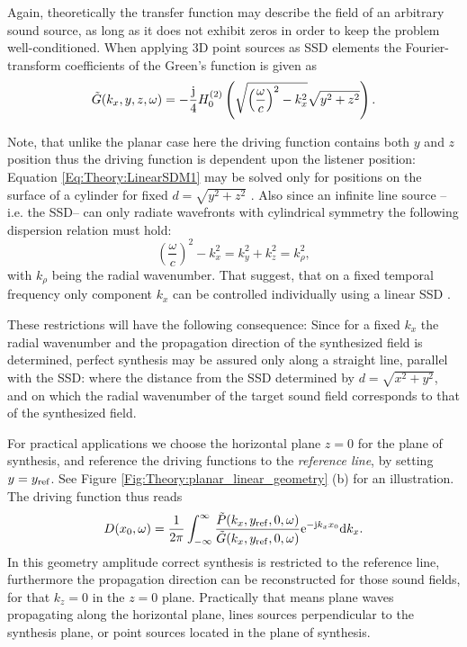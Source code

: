 Again, theoretically the transfer function may describe the field of an arbitrary sound source, as long as it does not exhibit zeros in order to keep the problem well-conditioned.
When applying 3D point sources as SSD elements the Fourier-transform coefficients of the Green's function is given as \cite{Ahrens2010a}
\begin{equation}
\tilde{G}(k_x,y,z,\omega) = -\frac{\mathrm{j}}{4} H_0^{(2)}\left( \sqrt{ \left( \frac{\omega}{c} \right)^2 - k_x^2 } \sqrt{ y^2 + z^2 } \right).
\end{equation}

\vspace{3mm}
Note, that unlike the planar case here the driving function contains both $y$ and $z$ position thus the driving function is dependent upon the listener position: Equation \eqref{Eq:Theory:LinearSDM1} may be solved only for positions on the surface of a cylinder for fixed $d = \sqrt{y^2 + z^2}$ \cite[p.~60.]{Ahrens2010phd}.
Also since an infinite line source --i.e. the SSD-- can only radiate wavefronts with cylindrical symmetry the following  dispersion relation must hold:
\begin{equation}
\left( \frac{\omega} {c}\right)^2 - k_x^2 = k_y^2 + k_z^2 = k_{\rho}^2,
\end{equation}
with $k_{\rho}$ being the radial wavenumber. That suggest, that on a fixed temporal frequency only component $k_x$ can be controlled individually using a linear SSD .

These restrictions will have the following consequence:
Since for a fixed $k_x$ the radial wavenumber and the propagation direction of the synthesized field is determined, perfect synthesis may be assured only along a straight line, parallel with the SSD: where the distance from the SSD determined by $d = \sqrt{x^2 + y^2}$, and on which the radial wavenumber of the target sound field corresponds to that of the synthesized field.

For practical applications we choose the horizontal plane $z=0$ for the plane of synthesis, and reference the driving functions to the \emph{reference line}, by setting $y = y_{\mathrm{ref}}$.
See Figure \ref{Fig:Theory:planar_linear_geometry} (b) for an illustration. The driving function thus reads
\begin{equation}
D(x_0,\omega) = \frac{1}{2\pi} \int_{-\infty}^{\infty} \frac{\tilde{P}(k_x,y_{\mathrm{ref}},0, \omega) }{\tilde{G}(k_x,y_{\mathrm{ref}},0, \omega)} \mathrm{e}^{-\mathrm{j} k_x x_0} \mathrm{d} k_x.
\label{Eq:Theory:Linear_SDM}
\end{equation}
In this geometry amplitude correct synthesis is restricted to the reference line, furthermore the propagation direction can be reconstructed for those sound fields, for that $k_z = 0$ in the $z=0$ plane. Practically that means plane waves propagating along the horizontal plane, lines sources perpendicular to the synthesis plane, or point sources located in the plane of synthesis.

